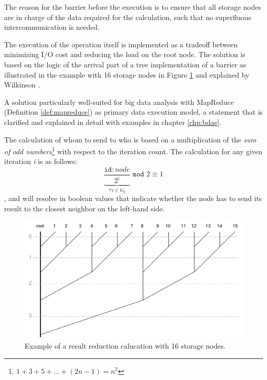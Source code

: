 \newpage
\noindent
The reason for the barrier before the execution is to ensure that all storage nodes are in charge of the data required for the calculation, such that no superfluous intercommunication is needed.
\newline

The execution of the operation itself is implemented as a tradeoff between minimizing I/O cost and reducing the load on the root node. The solution is based on the logic of the arrival part of a tree implementation of a barrier as illustrated in the example with 16 storage nodes in Figure \ref{fig:reduction-tree} and explained by Wilkinson \etal \cite{Wilkinson:1998:PPT:289352}.

A solution particularly well-suited for big data analysis with MapReduce (Definition \ref{def:mapreduce}) as primary data execution model, a statement that is clarified and explained in detail with examples in chapter \ref{chp:bdae}.
\newline

The calculation of whom to send to who is based on a multiplication of the \textit{sum of odd numbers}\footnote{$1 + 3 + 5 + \ldots + (2n-1) = n^2$} with respect to the iteration count. The calculation for any given iteration \textit{i} is as follows:
\begin{equation} \label{eq:reduction}
\underbrace{\dfrac{\texttt{id}:node}{2^{i}}}_{\forall i \in \mathbb{N}_0} \texttt{ mod } 2 \equiv 1
\end{equation}
, and will resolve in boolean values that indicate whether the node has to send its result to the closest neighbor on the left-hand side.
\newline

\begin{figure}
	\centering
	\includegraphics[scale=0.5]{pdf/reduction-tree.pdf}
	\caption[Result reduction calucation example]{Example of a result reduction calucation with 16 storage nodes. \label{fig:reduction-tree}}
\end{figure}	

